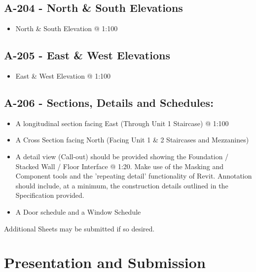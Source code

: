\subsection*{A-204 - North \& South Elevations}
\begin{itemize}
	\item North \& South Elevation @ 1:100
\end{itemize}

\subsection*{A-205 - East \& West Elevations}
\begin{itemize}
	\item East \& West Elevation @ 1:100
\end{itemize}

\subsection*{A-206 - Sections, Details and Schedules:}
\begin{itemize}
	\item A longitudinal section facing East (Through Unit 1 Staircase) @ 1:100
	\item A Cross Section facing North (Facing Unit 1 \& 2 Staircases and Mezzanines)
	\item A detail view (Call-out) should be provided showing the Foundation / Stacked Wall / Floor Interface @ 1:20.  Make use of the Masking and Component tools and the 'repeating detail' functionality of Revit.  Annotation should include, at a minimum, the construction details outlined in the Specification provided.
	\item A Door schedule and a Window Schedule
\end{itemize}

Additional Sheets may be submitted if so desired.




\newpage
\section*{Presentation and Submission}

